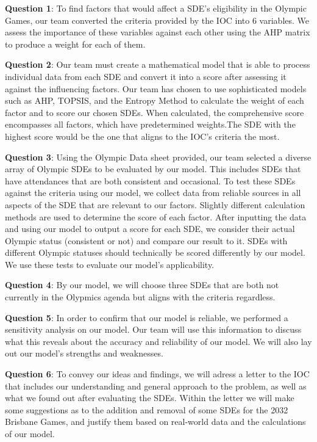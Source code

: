 \documentclass[12pt]{article}
\begin{document}
\textbf{Question 1}: 
To find factors that would affect a SDE’s eligibility in the Olympic Games, our team converted the criteria provided by the IOC into 6 variables. We assess the importance of these variables against each other using the AHP matrix to produce a weight for each of them.

\textbf{Question 2}: 
Our team must create a mathematical model that is able to process individual data from each SDE and convert it into a score after assessing it against the influencing factors. Our team has chosen to use sophisticated models such as AHP, TOPSIS, and the Entropy Method to calculate the weight of each factor and to score our chosen SDEs. When calculated, the comprehensive score encompasses all factors, which have predetermined weights.The SDE with the highest score would be the one that aligns to the IOC’s criteria the most. 

\textbf{Question 3}: 
Using the Olympic Data sheet provided, our team selected a diverse array of Olympic SDEs to be evaluated by our model. This includes SDEs that have attendances that are both consistent and occasional. To test these SDEs against the criteria using our model, we collect data from reliable sources in all aspects of the SDE that are relevant to our factors. Slightly different calculation methods are used to determine the score of each factor. After inputting the data and using our model to output a score for each SDE, we consider their actual Olympic status (consistent or not) and compare our result to it. SDEs with different Olympic statuses should technically be scored differently by our model. We use these tests to evaluate our model’s applicability.

\textbf{Question 4}: 
By our model, we will choose three SDEs that are both not currently in the Olypmics agenda but aligns with the criteria regardless.

\textbf{Question 5}: 
In order to confirm that our model is reliable, we performed a sensitivity analysis on our model. Our team will use this information to discuss what this reveals about the accuracy and reliability of our model. We will also lay out our model’s strengths and weaknesses.

\textbf{Question 6}: 
To convey our ideas and findings, we will adress a letter to the IOC that includes our understanding and general approach to the problem, as well as what we found out after evaluating the SDEs. Within the letter we will make some suggestions as to the addition and removal of some SDEs for the 2032 Brisbane Games, and justify them based on real-world data and the calculations of our model.
\end{document}
